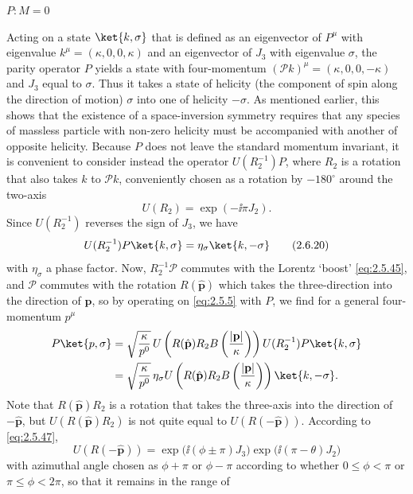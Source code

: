 \medskip
\noindent\textbf{$P:M=0$}

Acting on a state $\ket{k,\sigma}$ that is defined as an eigenvector of
$P^\mu$ with eigenvalue $k^\mu=(\kappa,0,0,\kappa)$ and an eigenvector of
$J_3$ with eigenvalue $\sigma$, the parity operator $P$ yields a state with
four-momentum $(\mathcal{P}k)^\mu=(\kappa,0,0,-\kappa)$ and $J_3$ equal to
$\sigma$. Thus it takes a state of helicity (the component of spin along the
direction of motion) $\sigma$ into one of helicity $-\sigma$. As mentioned
earlier, this shows that the existence of a space-inversion symmetry requires
that any species of massless particle with non-zero helicity must be
accompanied with another of opposite helicity. Because $P$ does not leave the
standard momentum invariant, it is convenient to consider instead the
operator $U(R_2^{-1})P$, where $R_2$ is a rotation that also takes $k$ to
$\mathcal{P}k$, conveniently chosen as a rotation by $-180^\circ$ around the
two-axis
\begin{equation}
U(R_2)=\exp(-\ii\pi J_2).
\tag{2.6.19}\label{eq:2.6.19}
\end{equation}
Since $U(R_2^{-1})$ reverses the sign of $J_3$, we have
\begin{equation}
U(R_2^{-1})P\ket{k,\sigma}=\eta_\sigma\ket{k,-\sigma}
\tag{2.6.20}\label{eq:2.6.20}
\end{equation}
with $\eta_\sigma$ a phase factor. Now, $R_2^{-1}\mathcal{P}$ commutes with the
Lorentz `boost' \eqref{eq:2.5.45}, and $\mathcal{P}$ commutes with the rotation
$R(\hat{\mathbf{p}})$ which takes the three-direction into the direction of
$\mathbf{p}$, so by operating on \eqref{eq:2.5.5} with $P$, we find for a general
four-momentum $p^\mu$
\[
\begin{aligned}
P\ket{p,\sigma}
&=\sqrt{\frac{\kappa}{p^0}}\,
U\left(R(\hat{\mathbf{p}})R_2B\left(\frac{|\mathbf{p}|}{\kappa}\right)\right)
U(R_2^{-1})P\ket{k,\sigma}\\
&=\sqrt{\frac{\kappa}{p^0}}\,\eta_\sigma
U\left(R(\hat{\mathbf{p}})R_2B\left(\frac{|\mathbf{p}|}{\kappa}\right)\right)
\ket{k,-\sigma}.
\end{aligned}
\]
Note that $R(\hat{\mathbf{p}})R_2$ is a rotation that takes the three-axis into
the direction of $-\hat{\mathbf{p}}$, but
$U(R(\hat{\mathbf{p}})R_2)$ is not quite equal to
$U(R(-\hat{\mathbf{p}}))$. According to \eqref{eq:2.5.47},
\[
U(R(-\hat{\mathbf{p}}))
=\exp\bigl(\ii(\phi\pm\pi)J_3\bigr)
 \exp\bigl(\ii(\pi-\theta)J_2\bigr)
\]
with azimuthal angle chosen as $\phi+\pi$ or $\phi-\pi$ according to whether
$0\leq\phi<\pi$ or $\pi\leq\phi<2\pi$, so that it remains in the range of
